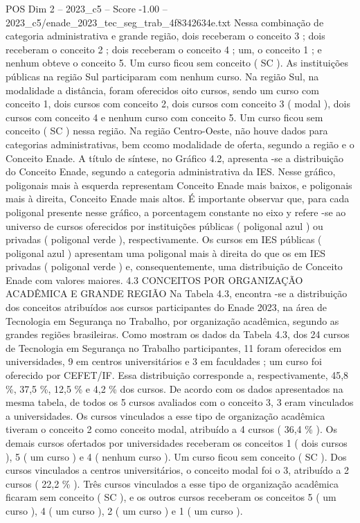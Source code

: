 \begin{textsample}{POS Dim 2 – 2023\_c5 – Score -1.00 – 2023\_c5/enade\_2023\_tec\_seg\_trab\_4f8342634e.txt}
Nessa combinação de categoria administrativa e grande região, dois receberam o conceito 3 ; dois receberam o conceito 2 ; dois receberam o conceito 4 ; um, o conceito 1 ; e nenhum obteve o conceito 5.
Um curso ficou sem conceito ( SC ).
As instituições públicas na região Sul participaram com nenhum curso.
Na região Sul, na modalidade a distância, foram oferecidos oito cursos, sendo um curso com conceito 1, dois cursos com conceito 2, dois cursos com conceito 3 ( modal ), dois cursos com conceito 4 e nenhum curso com conceito 5.
Um curso ficou sem conceito ( SC ) nessa região.
Na região Centro-Oeste, não houve dados para categorias administrativas, bem ccomo modalidade de oferta, segundo a região e o Conceito Enade.
A título de síntese, no Gráfico 4.2, apresenta -se a distribuição do Conceito Enade, segundo a categoria administrativa da IES.
Nesse gráfico, poligonais mais à esquerda representam Conceito Enade mais baixos, e poligonais mais à direita, Conceito Enade mais altos.
É importante observar que, para cada poligonal presente nesse gráfico, a porcentagem constante no eixo y refere -se ao universo de cursos oferecidos por instituições públicas ( poligonal azul ) ou privadas ( poligonal verde ), respectivamente.
Os cursos em IES públicas ( poligonal azul ) apresentam uma poligonal mais à direita do que os em IES privadas ( poligonal verde ) e, consequentemente, uma distribuição de Conceito Enade com valores maiores. 4.3 CONCEITOS POR ORGANIZAÇÃO ACADÊMICA E GRANDE REGIÃO Na Tabela 4.3, encontra -se a distribuição dos conceitos atribuídos aos cursos participantes do Enade 2023, na área de Tecnologia em Segurança no Trabalho, por organização acadêmica, segundo as grandes regiões brasileiras.
Como mostram os dados da Tabela 4.3, dos 24 cursos de Tecnologia em Segurança no Trabalho participantes, 11 foram oferecidos em universidades, 9 em centros universitários e 3 em faculdades ; um curso foi oferecido por CEFET/IF.
Essa distribuição corresponde a, respectivamente, 45,8 \%, 37,5 \%, 12,5 \% e 4,2 \% dos cursos.
De acordo com os dados apresentados na mesma tabela, de todos os 5 cursos avaliados com o conceito 3, 3 eram vinculados a universidades.
Os cursos vinculados a esse tipo de organização acadêmica tiveram o conceito 2 como conceito modal, atribuído a 4 cursos ( 36,4 \% ).
Os demais cursos ofertados por universidades receberam os conceitos 1 ( dois cursos ), 5 ( um curso ) e 4 ( nenhum curso ).
Um curso ficou sem conceito ( SC ).
Dos cursos vinculados a centros universitários, o conceito modal foi o 3, atribuído a 2 cursos ( 22,2 \% ).
Três cursos vinculados a esse tipo de organização acadêmica ficaram sem conceito ( SC ), e os outros cursos receberam os conceitos 5 ( um curso ), 4 ( um curso ), 2 ( um curso ) e 1 ( um curso ).

\end{textsample}
